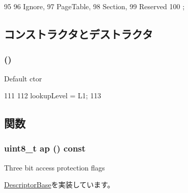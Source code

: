 \begin{DoxyCode}
95                        {
96             Ignore,
97             PageTable,
98             Section,
99             Reserved
100         };
\end{DoxyCode}


\subsection{コンストラクタとデストラクタ}
\hypertarget{classArmISA_1_1TableWalker_1_1L1Descriptor_a5efa3eba5e8b923e0d061e7d6f781225}{
\subsubsection[{L1Descriptor}]{ ()}}
\label{classArmISA_1_1TableWalker_1_1L1Descriptor_a5efa3eba5e8b923e0d061e7d6f781225}
Default ctor 


\begin{DoxyCode}
111         {
112             lookupLevel = L1;
113         }
\end{DoxyCode}


\subsection{関数}
\hypertarget{classArmISA_1_1TableWalker_1_1L1Descriptor_a4fc87654615da601dbbc3cb6dd1046ee}{
\subsubsection[{ap}]{\setlength{\rightskip}{0pt plus 5cm}uint8\_\-t ap () const}}
\label{classArmISA_1_1TableWalker_1_1L1Descriptor_a4fc87654615da601dbbc3cb6dd1046ee}
Three bit access protection flags 

\hyperlink{classArmISA_1_1TableWalker_1_1DescriptorBase_ab524583b20762c07d0a20a418b858586}{DescriptorBase}を実装しています。


